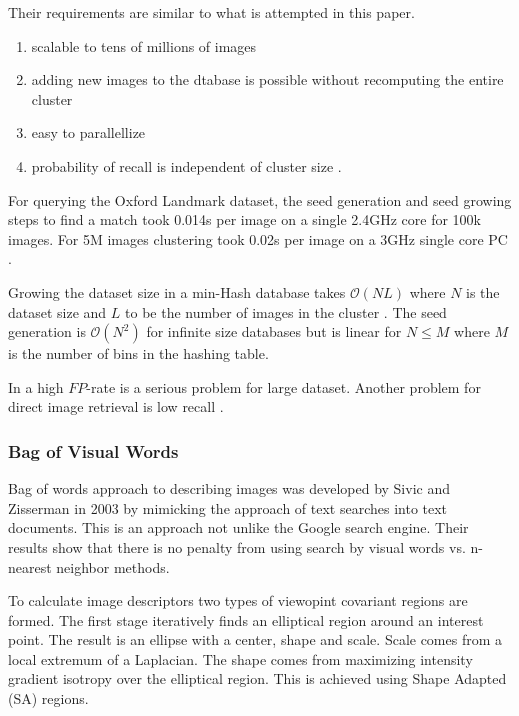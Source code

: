 \documentclass[english,12pt,a4paper,pdftex,elec,utf8]{aaltothesis}
\begin{document}
Their requirements are similar to what is attempted in this paper.

\begin{enumerate}
\item scalable to tens of millions of images
\item adding new images to the dtabase is possible without recomputing the entire cluster
\item easy to parallellize
\item probability of recall is independent of cluster size \cite{Chum2010}.
\end{enumerate}

For querying the Oxford Landmark dataset, the seed generation and seed growing steps to find a match took 0.014s per image on a single 2.4GHz core for 100k images. For 5M images clustering took 0.02s per image on a 3GHz single core PC \cite{Chum2010}.

Growing the dataset size in a min-Hash database takes $\mathcal{O}(NL)$ where $N$ is the dataset size and $L$ to be the number of images in the cluster \cite{Chum2010}. The seed generation is $\mathcal{O}(N^2)$ for infinite size databases but is linear for $N \leq M$ where $M$ is the number of bins in the hashing table.

In \cite{Lee2010} a high $FP$-rate is a serious problem for large dataset. Another problem for direct image retrieval is low recall \cite{Chum2010}.



\subsubsection{Bag of Visual Words}\label{BOW}
Bag of words approach to describing images was developed by Sivic and Zisserman in 2003 by mimicking the approach of text searches into text documents. This is an approach not unlike the Google search engine. Their results show that there is no penalty from using search by visual words vs. n-nearest neighbor methods.\cite{Sivic2003}

To calculate image descriptors two types of viewopint covariant regions are formed. The first stage iteratively finds an elliptical region around an interest point. The result is an ellipse with a center, shape and scale. Scale comes from a local extremum of a Laplacian. The shape comes from maximizing intensity gradient isotropy over the elliptical region. This is achieved using Shape Adapted (SA) regions.\cite{Sivic2003}
\end{document}
